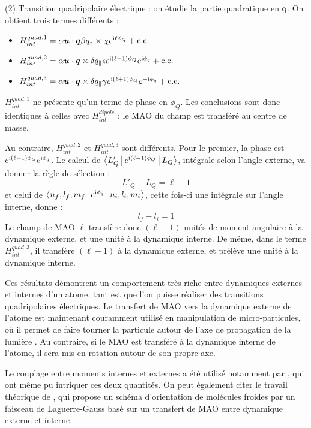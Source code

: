 (2) Transition quadripolaire électrique : on étudie la partie quadratique en $\bm{q}$. On obtient trois termes différents :
\begin{itemize}
\renewcommand{\labelitemi}{$\bullet$}
\setlength\itemsep{1em}
\item $H^{quad,1}_{int} = \alpha\bm{u}\cdot\bm{q}\beta q_z \times\chi e^{\mathrm{i}\ell\phi_Q}+\text{c.c.}$ 
\item $H^{quad,2}_{int} = \alpha\bm{u}\cdot\bm{q} \times \delta q_{\parallel}\epsilon e^{\mathrm{i}(\ell-1)\phi_Q}e^{\mathrm{i} \phi_q}+\text{c.c.}$
\item $H^{quad,3}_{int} = \alpha\bm{u}\cdot\bm{q} \times \delta q_{\parallel}\gamma e^{\mathrm{i}(\ell+1)\phi_Q}e^{-\mathrm{i} \phi_q}+\text{c.c.}$
\end{itemize}


$H^{quad,1}_{int}$ ne présente qu'un terme de phase en $\phi_Q$. Les conclusions sont donc identiques à celles avec $H^{dipole}_{int}$ : le MAO du champ est transféré au centre de masse.\par
Au contraire, $H^{quad,2}_{int}$ et $H^{quad,3}_{int}$ sont différents. Pour le premier, la phase est $e^{\mathrm{i}(\ell-1)\phi_Q}e^{\mathrm{i} \phi_q}$. Le calcul de $\Braket{L'_Q|e^{\mathrm{i}(\ell-1)\phi_Q}|L_Q}$, intégrale selon l'angle externe, va donner la règle de sélection :
\[L'_Q-L_Q=\ell-1\]
et celui de $\Braket{{n_f,l_f,m_f}|e^{\mathrm{i}\phi_q}|n_i,l_i,m_i}$, cette fois-ci une intégrale sur l'angle interne, donne :
\[l_f-l_i = 1\]
Le champ de MAO $\ell$ transfère donc $(\ell-1)$ unités de moment angulaire à la dynamique externe, et une unité à la dynamique interne. De même, dans le terme $H^{quad,3}_{int}$, il transfère $(\ell+1)$ à la dynamique externe, et prélève une unité à la dynamique interne.

Ces résultats démontrent un comportement très riche entre dynamiques externes et internes d'un atome, tant est que l'on puisse réaliser des transitions quadripolaires électriques. Le transfert de MAO vers la dynamique externe de l'atome est maintenant couramment utilisé en manipulation de micro-particules, où il permet de faire tourner la particule autour de l'axe de propagation de la lumière . Au contraire, si le MAO est transféré à la dynamique interne de l'atome, il sera mis en rotation autour de son propre axe.\par
Le couplage entre moments internes et externes a été utilisé notamment par , qui ont même pu intriquer ces deux quantités. On peut également citer le travail théorique de , qui propose un schéma d'orientation de molécules froides par un faisceau de Laguerre-Gauss basé sur un transfert de MAO entre dynamique externe et interne.

